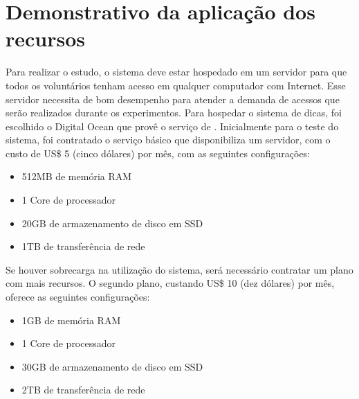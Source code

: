 \chapter{Demonstrativo da aplicação dos recursos}

Para realizar o estudo, o sistema deve estar hospedado em um servidor para que todos os voluntários tenham acesso em qualquer computador com Internet. Esse servidor necessita de bom desempenho para atender a demanda de acessos que serão realizados durante os experimentos. Para hospedar o sistema de dicas, foi escolhido o Digital Ocean que provê o serviço de . Inicialmente para o teste do sistema, foi contratado o serviço básico que disponibiliza um servidor, com o custo de US\$ 5 (cinco dólares) por mês, com as seguintes configurações:

\begin{itemize}
	\item 512MB de memória RAM
	\item 1 Core de processador
	\item 20GB de armazenamento de disco em SSD
	\item 1TB de transferência de rede
\end{itemize}

Se houver sobrecarga na utilização do sistema, será necessário contratar um plano com mais recursos. O segundo plano, custando US\$ 10 (dez dólares) por mês, oferece as seguintes configurações:

\begin{itemize}
	\item 1GB de memória RAM
	\item 1 Core de processador
	\item 30GB de armazenamento de disco em SSD
	\item 2TB de transferência de rede
\end{itemize}
